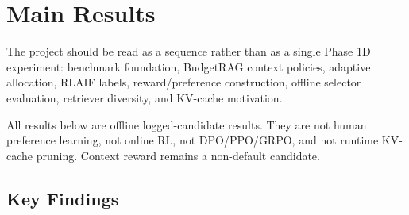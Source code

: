 \section{Main Results}

The project should be read as a sequence rather than as a single Phase 1D experiment: benchmark foundation, BudgetRAG context policies, adaptive allocation, RLAIF labels, reward/preference construction, offline selector evaluation, retriever diversity, and KV-cache motivation.

All results below are offline logged-candidate results. They are not human preference learning, not online RL, not DPO/PPO/GRPO, and not runtime KV-cache pruning. Context reward remains a non-default candidate.

\subsection{Key Findings}

